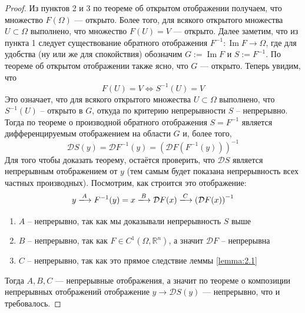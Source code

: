 \documentclass[11pt]{article}
\DeclareMathOperator{\Imm}{Im}
\begin{document}
\begin{proof}
    Из пунктов 2 и 3 по теореме об открытом отображении получаем, что множество $F(\Omega)$ --- открыто.
    Более того, для всякого открытого множества $U \subset \Omega$ выполнено, что множество $F(U) = V$ --- открыто.
    Далее заметим, что из пункта 1 следует существование обратного отображения $F^{-1} \colon \Imm F \to \Omega$, 
    где для удобства (ну или же для спокойствия) обозначим $G := \Imm F$ и $S := F^{-1}$.
    По теореме об открытом отображении также ясно, что $G$ --- открыто. Теперь увидим, что
    \[F(U) = V \Longleftrightarrow S^{-1}(U) = V\]
    Это означает, что для всякого открытого множества $U \subset \Omega$ выполнено, что $S^{-1}(U)$ -- открыто в $G$, откуда по критерию непрерывности $S$ -- непрерывно.
    Тогда по теореме о производной обратного отображения $S = F^{-1}$ является дифференцируемым 
    отображением на области $G$ и, более того, 
    \[\mathcal{D} S(y) = \mathcal{D} F^{-1}(y) = \left( \mathcal{D} F\left( F^{-1}(y) \right) \right)^{-1}\]
    Для того чтобы доказать теорему, остаётся проверить, что $\mathcal{D} S$ является непрерывным 
    отображением от $y$ (тем самым будет показана непрерывность всех частных производных). Посмотрим, как строится это отображение:
    \[y \xlongrightarrow{A} F^{-1}(y) = x \xlongrightarrow{B} \mathcal{D} F(x) \xlongrightarrow{C} \left( \mathcal{D} F(x) \right)^{-1}\]
    \begin{enumerate}
        \item $A$ -- непрерывно, так как мы доказывали непрерывность $S$ выше
        \item $B$ -- непрерывно, так как $F \in C^1(\Omega, \mathbb{R}^n)$, а значит $\mathcal{D} F$ -- непрерывна
        \item $C$ -- непрерывно, так как это прямое следствие леммы \ref{lemma:2.1} 
    \end{enumerate}
    Тогда $A, B, C$ --- непрерывные отображения, а значит по теореме о композиции непрерывных отображений отображение $y \to \mathcal{D} S(y)$ --- непрерывно, что и требовалось. 
\end{proof}
\end{document}
